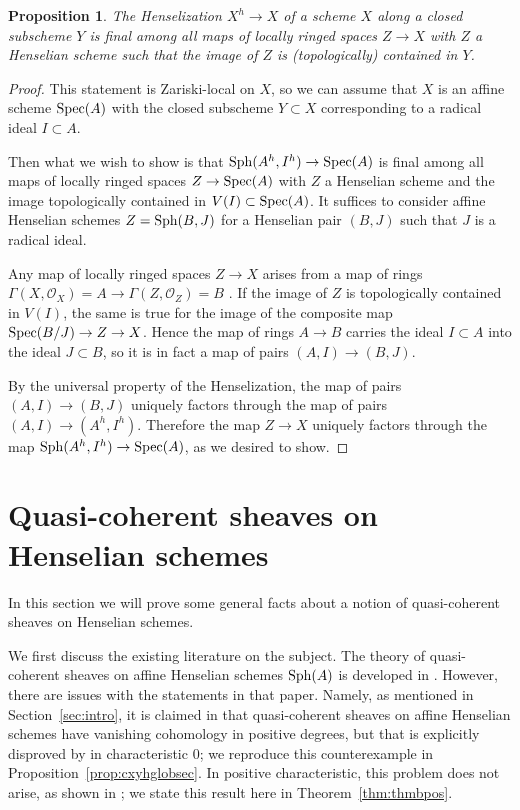 \documentclass[12pt]{article}
\renewcommand{\O}{\mathscr{O}}
\newcommand{\spec}{{\rm Spec}}
\newcommand{\sph}{{\rm Sph}}
\newtheorem{proposition}[theorem]{Proposition}
\theoremstyle{definition}
\numberwithin{equation}{subsection}
\begin{document}
\begin{proposition}\label{prop:hensationfinal} The Henselization $X^h \to X$ of a scheme $X$ along a closed subscheme $Y$ is final among all maps of locally ringed spaces $Z \to X$ with $Z$ a Henselian scheme such that the image of $Z$ is (topologically) contained in $Y$.
\end{proposition}
\begin{proof} This statement is Zariski-local on $X$, so we can assume that $X$ is an affine scheme $\spec(A)$ with the closed subscheme $Y \subset X$ corresponding to a radical ideal $I \subset A$.

Then what we wish to show is that $\sph(A^h,I^h) \to \spec(A)$ is final among all maps of locally ringed spaces $Z \to \spec(A)$ with $Z$ a Henselian scheme and the image topologically contained in $V(I) \subset \spec(A)$. It suffices to consider affine Henselian schemes $Z=\sph(B,J)$ for a Henselian pair $(B,J)$ such that $J$ is a radical ideal.

Any map of locally ringed spaces $Z \to X$ arises from a map of rings $\Gamma(X,\O_X)=A \to \Gamma(Z,\O_Z)=B$ \cite[Errata et Addenda, Proposition 1.8.1]{ega2}. If the image of $Z$ is topologically contained in $V(I)$, the same is true for the image of the composite map $\spec(B/J) \to Z \to X$. Hence the map of rings $A \to B$ carries the ideal $I \subset A$ into the ideal $J \subset B$, so it is in fact a map of pairs $(A,I) \to (B,J)$. 

By the universal property of the Henselization, the map of pairs $(A,I) \to (B,J)$ uniquely factors through the map of pairs $(A,I) \to (A^h,I^h)$. Therefore the map $Z \to X$ uniquely factors through the map $\sph(A^h,I^h) \to \spec(A)$, as we desired to show. \end{proof}



\section{Quasi-coherent sheaves on Henselian schemes}\label{sec:qcoh}



In this section we will prove some general facts about a notion of quasi-coherent sheaves on Henselian schemes. 

We first discuss the existing literature on the subject. The theory of quasi-coherent sheaves on affine Henselian schemes $\sph(A)$ is developed in \cite{greco81}. However, there are issues with the statements in that paper. Namely, as mentioned in Section~\ref{sec:intro}, it is claimed in \cite[Theorem 1.12 (Theorem B)]{greco81} that quasi-coherent sheaves on affine Henselian schemes have vanishing cohomology in positive degrees, but that is explicitly disproved by \cite{nothmbblog} in characteristic $0$; we reproduce this counterexample in Proposition~\ref{prop:cxyhglobsec}. In positive characteristic, this problem does not arise, as shown in \cite{thmbblog}; we state this result here in Theorem~\ref{thm:thmbpos}.
\end{document}
